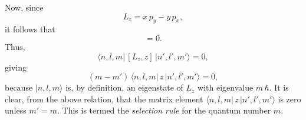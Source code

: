 Now, since
\begin{equation}
L_z = x\,p_y - y\, p_x,
\end{equation}
it follows that
\begin{equation}
[L_z, z] = 0.
\end{equation}
Thus,
\begin{equation}
\langle n,l, m|\, [L_z, z]\, | n',l',m'\rangle = 0,
\end{equation}
giving 
\begin{equation}
(m - m')\, \langle  n,l, m|\,z\,| n',l',m'\rangle = 0,
\end{equation}
because $|n,l,m\rangle$ is, by definition, an eigenstate of $L_z$ with eigenvalue
$m\,\hbar$. It is clear, from the above relation, that
the matrix element $\langle  n,l, m|\,z\,| n',l',m'\rangle$ is zero unless $m'=m$. 
This is termed the {\em selection rule}\/ for the quantum number $m$.

